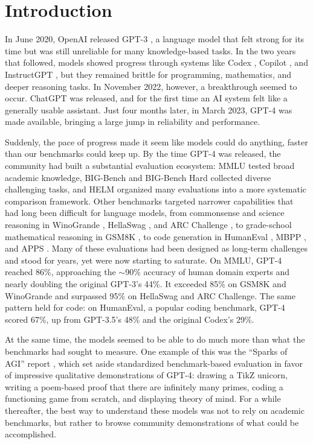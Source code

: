 \chapter{Introduction}
\label{chap:introduction}

In June 2020, OpenAI released GPT-3 \citep{brown2020language}, a language model that
felt strong for its time but was still unreliable for many knowledge-based tasks.
In the two years that followed, models showed progress through systems like Codex \citep{chen2021evaluating},
Copilot \citep{github2023copilot}, and InstructGPT \citep{ouyang2022training}, but they remained brittle for programming, mathematics, and deeper
reasoning tasks. In November 2022, however, a breakthrough seemed to occur. ChatGPT was 
released, and for the first time an AI system felt like a generally usable assistant. 
Just four months later, in March 2023, GPT-4 \citep{openai2023gpt4} was made available, bringing a large jump 
in reliability and performance.

Suddenly, the pace of progress made it seem like models could do anything, faster than our benchmarks
could keep up. By the time GPT-4 was released, the community had built a
substantial evaluation ecosystem: MMLU \citep{hendrycks2020measuring} tested broad academic knowledge, 
BIG-Bench \citep{srivastava2022beyond} and BIG-Bench Hard \citep{suzgun2022challenging} collected diverse 
challenging tasks, and HELM \citep{liang2022holistic} organized many evaluations into a more systematic comparison 
framework. Other benchmarks targeted narrower capabilities that had long been difficult for language models, from 
commonsense and science reasoning in WinoGrande \citep{sakaguchi2021winogrande}, HellaSwag \citep{zellers2019hellaswag}, 
and ARC Challenge \citep{clark2018think}, to grade-school mathematical reasoning in GSM8K \citep{cobbe2021training}, 
to code generation in HumanEval \citep{chen2021evaluating}, MBPP \citep{mbpp}, and APPS \citep{hendrycks2021measuring}. 
Many of these evaluations had been designed as long-term challenges and stood for years, yet were now starting
to saturate. On MMLU, GPT-4 reached 86\%, approaching the $\sim$90\% accuracy of human domain experts and nearly
doubling the original GPT-3's 44\%. It exceeded 85\% on GSM8K and WinoGrande and surpassed 95\% on HellaSwag and
ARC Challenge. The same pattern held for code: on HumanEval, a popular coding benchmark, GPT-4 scored 67\%, up
from GPT-3.5's 48\% and the original Codex's 29\%.

At the same time, the models seemed to be able to do much more than what the benchmarks had sought
to measure. One example of this was the ``Sparks of AGI'' report \citep{bubeck2023sparks}, which
set aside standardized benchmark-based evaluation in favor of impressive qualitative demonstrations 
of GPT-4: drawing a TikZ unicorn, writing a poem-based proof that there are infinitely many primes, 
coding a functioning game from scratch, and displaying theory of mind. For a while thereafter, the best 
way to understand these models was not to rely on academic benchmarks, but rather to browse community 
demonstrations of what could be accomplished.

